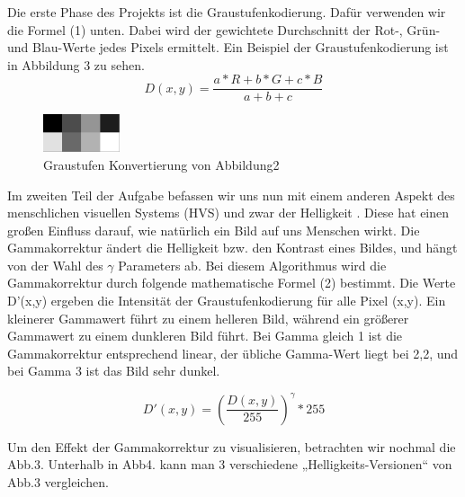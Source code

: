 \documentclass[course=erap]{aspdoc}
\begin{document}
\par
Die erste Phase des Projekts ist die Graustufenkodierung. Dafür verwenden wir die Formel (1) unten. Dabei wird der gewichtete Durchschnitt der Rot-, Grün- und Blau-Werte jedes Pixels ermittelt. Ein Beispiel der Graustufenkodierung ist in Abbildung 3 zu sehen. 
\begin{equation}
D(x,y)=\frac{a*R+b*G+c*B}{a+b+c}
\end{equation}


\begin{figure}[h]
\centering
\includegraphics[width=0.2\textwidth]{Bilder/gamma1.pgm.png}
\caption{Graustufen Konvertierung von Abbildung2}
\end{figure}

\par
Im zweiten Teil der Aufgabe befassen wir uns nun mit einem anderen Aspekt des menschlichen visuellen Systems (HVS) und zwar der Helligkeit \cite{westin2011gammacorrection}. Diese hat einen großen Einfluss darauf, wie natürlich ein Bild auf uns Menschen wirkt. Die Gammakorrektur ändert die Helligkeit bzw. den Kontrast eines Bildes, und hängt von der Wahl des $ \gamma $ Parameters ab. Bei diesem Algorithmus wird die Gammakorrektur durch folgende mathematische Formel (2) bestimmt. Die Werte D'(x,y) ergeben die Intensität der Graustufenkodierung für alle Pixel (x,y). Ein kleinerer Gammawert führt zu einem helleren Bild, während ein größerer Gammawert zu einem dunkleren Bild führt. Bei Gamma gleich 1 ist die Gammakorrektur entsprechend linear, der übliche Gamma-Wert liegt bei 2,2, und bei Gamma 3 ist das Bild sehr dunkel.\cite{cambridgeincolor2020gammacorrection}

\begin{equation}
D'(x,y)={\left( \frac{D(x,y)}{255} \right)}^{\gamma}*255
\end{equation}

\par
Um den Effekt der Gammakorrektur zu visualisieren, betrachten wir nochmal die Abb.3. Unterhalb in Abb4. kann man 3 verschiedene „Helligkeits-Versionen“ von Abb.3 vergleichen.
\end{document}
